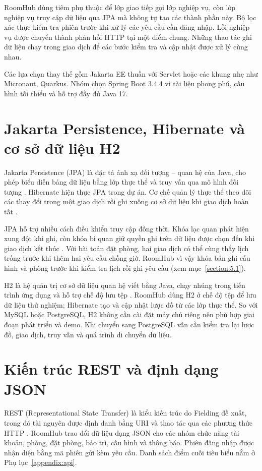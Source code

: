 \documentclass[../DoAn.tex]{subfiles}
\begin{document}
RoomHub dùng tiêm phụ thuộc để lớp giao tiếp gọi lớp nghiệp vụ, còn lớp nghiệp vụ truy cập dữ liệu qua JPA mà không tự tạo các thành phần này. Bộ lọc xác thực kiểm tra phiên trước khi xử lý các yêu cầu cần đăng nhập. Lỗi nghiệp vụ được chuyển thành phản hồi HTTP tại một điểm chung. Những thao tác ghi dữ liệu chạy trong giao dịch để các bước kiểm tra và cập nhật được xử lý cùng nhau.

Các lựa chọn thay thế gồm Jakarta EE thuần với Servlet hoặc các khung nhẹ như Micronaut, Quarkus. Nhóm chọn Spring Boot 3.4.4 vì tài liệu phong phú, cấu hình tối thiểu và hỗ trợ đầy đủ Java 17.

\section{Jakarta Persistence, Hibernate và cơ sở dữ liệu H2}
\label{section:3.3}
Jakarta Persistence (JPA) là đặc tả ánh xạ đối tượng -- quan hệ của Java, cho phép biểu diễn bảng dữ liệu bằng lớp thực thể và truy vấn qua mô hình đối tượng \cite{jakartapersistence31}. Hibernate hiện thực JPA trong dự án. Cơ chế quản lý thực thể theo dõi các thay đổi trong một giao dịch rồi ghi xuống cơ sở dữ liệu khi giao dịch hoàn tất \cite{fowler2002peaa}.

JPA hỗ trợ nhiều cách điều khiển truy cập đồng thời. Khóa lạc quan phát hiện xung đột khi ghi, còn khóa bi quan giữ quyền ghi trên dữ liệu được chọn đến khi giao dịch kết thúc \cite{bernstein2009transaction}. Với bài toán đặt phòng, hai giao dịch có thể cùng thấy lịch trống trước khi thêm hai yêu cầu chồng giờ. RoomHub vì vậy khóa bản ghi cấu hình và phòng trước khi kiểm tra lịch rồi ghi yêu cầu (xem mục~\ref{section:5.1}).

H2 là hệ quản trị cơ sở dữ liệu quan hệ viết bằng Java, chạy nhúng trong tiến trình ứng dụng và hỗ trợ chế độ lưu tệp \cite{h2database}. RoomHub dùng H2 ở chế độ tệp để lưu dữ liệu thử nghiệm; Hibernate tạo và cập nhật lược đồ từ các lớp thực thể. So với MySQL hoặc PostgreSQL, H2 không cần cài đặt máy chủ riêng nên phù hợp giai đoạn phát triển và demo. Khi chuyển sang PostgreSQL vẫn cần kiểm tra lại lược đồ, giao dịch, truy vấn và quá trình di chuyển dữ liệu.

\section{Kiến trúc REST và định dạng JSON}
\label{section:3.4}
REST (Representational State Transfer) là kiểu kiến trúc do Fielding đề xuất, trong đó tài nguyên được định danh bằng URI và thao tác qua các phương thức HTTP \cite{fielding2000rest}. RoomHub trao đổi dữ liệu dạng JSON cho các nhóm chức năng tài khoản, phòng, đặt phòng, bảo trì, cấu hình và thông báo. Phiên đăng nhập được nhận diện bằng mã phiên gửi kèm yêu cầu. Danh sách điểm cuối tiêu biểu nằm ở Phụ lục~\ref{appendix:api}.
\end{document}

